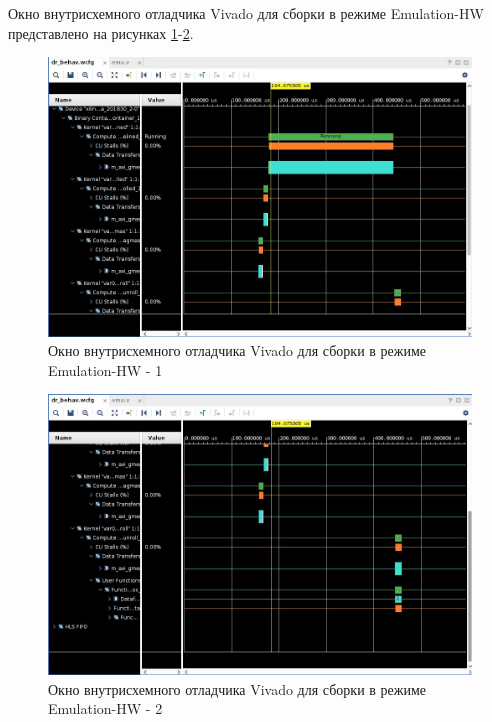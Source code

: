 Окно внутрисхемного отладчика Vivado для сборки в режиме Emulation-HW представлено на рисунках \ref{img:debugger1}-\ref{img:debugger2}.

\begin{figure}[H]
	\begin{center}
		\includegraphics[scale=0.4]{img/debugger1.png}
	\end{center}
	\captionsetup{justification=centering}
	\caption{Окно внутрисхемного отладчика Vivado для сборки в
режиме Emulation-HW - 1}
	\label{img:debugger1}
\end{figure}

\begin{figure}[H]
	\begin{center}
		\includegraphics[scale=0.4]{img/debugger2.png}
	\end{center}
	\captionsetup{justification=centering}
	\caption{Окно внутрисхемного отладчика Vivado для сборки в
режиме Emulation-HW - 2}
	\label{img:debugger2}
\end{figure}

